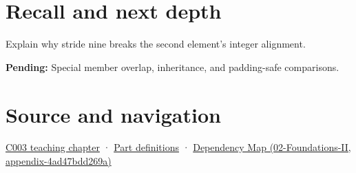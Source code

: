 \section{Recall and next depth}\label{appendix-f52f8c5a3afd-recall-and-next-depth}

Explain why stride nine breaks the second element's integer alignment.

\textbf{Pending:} Special member overlap, inheritance, and padding-safe comparisons.

\section{Source and navigation}\label{appendix-f52f8c5a3afd-source-and-navigation}

\href{Continuous\%20Notes/Computing\%20Foundations\%20-\%20From\%20Bits\%20to\%20C++\%20and\%20Systems\%20APIs\#Where\%20the\%20bytes\%20live}{C003 teaching chapter} · \hyperref[appendix-fd090d982a15-m003---parts-41-60]{Part definitions} · \href{../02-Foundations-II/main.pdf\#nameddest=appendix-4ad47bdd269a}{Dependency Map (02-Foundations-II, appendix-4ad47bdd269a)}
